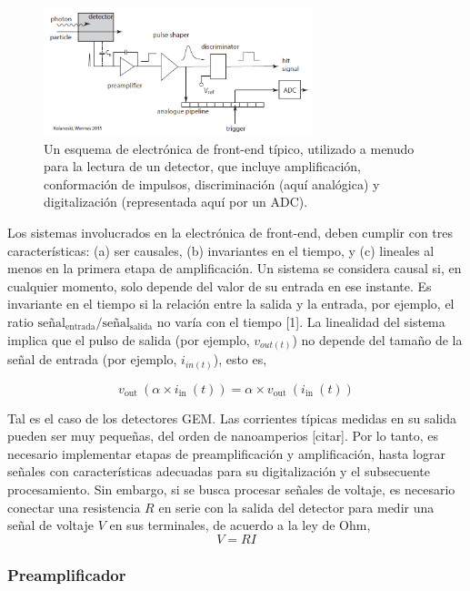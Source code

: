 \documentclass[]{book}
\begin{document}
\begin{figure}[h]
    \centering
    \includegraphics[width=0.7\textwidth]{typical_readout_electronics.PNG}
    \caption{Un esquema de electrónica de front-end típico, utilizado a menudo para la lectura de un
    detector, que incluye amplificación, conformación de impulsos, discriminación
    (aquí analógica) y digitalización (representada aquí por un ADC).}
    \label{fig:generic_frontend}

\end{figure}

\noindent Los sistemas involucrados en la electrónica de front-end, deben cumplir con tres características: (a) ser causales, (b) invariantes en el tiempo, y (c) lineales al menos en la primera etapa de amplificación. Un sistema se considera causal si, en cualquier momento, solo depende del valor de su entrada en ese instante. Es invariante en el tiempo si la relación entre la salida y la entrada, por ejemplo, el ratio $\text{señal}_{\text{entrada}}/\text{señal}_{\text{salida}}$ no varía con el tiempo [1]. La linealidad del sistema implica que el pulso de salida (por ejemplo, $v_{out(t)}$) no depende del tamaño de la señal de entrada (por ejemplo, $i_{in(t)}$), esto es, 

$$
v_{\text {out }}\left(\alpha \times i_{\text {in }}(t)\right)=\alpha \times v_{\text {out }}\left(i_{\text {in }}(t)\right)
$$

\noindent Tal es el caso de los detectores GEM. Las corrientes típicas medidas en su salida pueden ser muy pequeñas, del orden de nanoamperios [citar]. Por lo tanto, es necesario implementar etapas de preamplificación y amplificación, hasta lograr señales con características adecuadas para su digitalización y el subsecuente procesamiento. Sin embargo, si se busca procesar señales de voltaje, es necesario conectar una resistencia $R$ en serie con la salida del detector para medir una señal de voltaje $V$ en sus terminales, de acuerdo a la ley de Ohm, $$V = R I$$ 

\subsubsection{Preamplificador}
\end{document}
